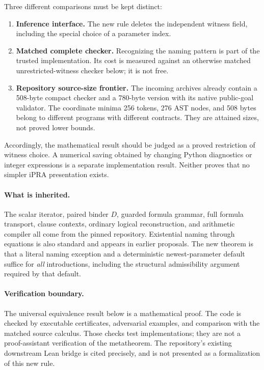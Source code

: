\documentclass[11pt,letterpaper]{article}
\theoremstyle{definition}\newtheorem{definition}[theorem]{Definition}
\theoremstyle{remark}\newtheorem{remark}[theorem]{Remark}
\begin{document}
Three different comparisons must be kept distinct:
\begin{enumerate}
\item \textbf{Inference interface.} The new rule deletes the independent
      witness field, including the special choice of a parameter index.
\item \textbf{Matched complete checker.} Recognizing the naming pattern is
      part of the trusted implementation. Its cost is measured against an
      otherwise matched unrestricted-witness checker below; it is not free.
\item \textbf{Repository source-size frontier.} The incoming archives already
      contain a 508-byte compact checker and a 780-byte version with its
      native public-goal validator. The coordinate minima 256 tokens,
      276 AST nodes, and 508 bytes belong to different programs with different
      contracts. They are attained sizes, not proved lower bounds.
\end{enumerate}

Accordingly, the mathematical result should be judged as a proved restriction
of witness choice. A numerical saving obtained by changing Python diagnostics
or integer expressions is a separate implementation result. Neither proves
that no simpler iPRA presentation exists.

\paragraph{What is inherited.}
The scalar iterator, paired binder $D$, guarded formula grammar, full formula
transport, clause contexts, ordinary logical reconstruction, and arithmetic
compiler all come from the pinned repository. Existential naming through
equations is also standard and appears in earlier proposals. The new theorem
is that a literal naming exception and a deterministic newest-parameter
default suffice for \emph{all} introductions, including the structural
admissibility argument required by that default.

\paragraph{Verification boundary.}
The universal equivalence result below is a mathematical proof. The code is
checked by executable certificates, adversarial examples, and comparison
with the matched source calculus. Those checks test implementations; they
are not a proof-assistant verification of the metatheorem. The repository's
existing downstream Lean bridge is cited precisely, and is not presented as
a formalization of this new rule.
\end{document}
